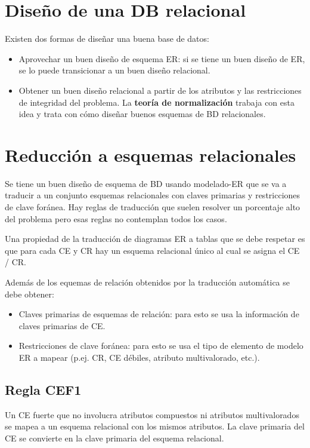 \documentclass[12pt,a4paper]{report}
\begin{document}
	\section{Diseño de una DB relacional}
		\par Existen dos formas de diseñar una buena base de datos:
		\begin{itemize}
			\item Aprovechar un buen diseño de esquema ER: si se tiene un buen diseño de ER, se lo puede transicionar a un buen diseño relacional. 
			\item Obtener un buen diseño relacional a partir de los atributos y las restricciones de integridad del problema. La \textbf{teoría de normalización} trabaja con esta idea y trata con cómo diseñar buenos esquemas de BD relacionales.
		\end{itemize}
	
	\section{Reducción a esquemas relacionales}
		\par Se tiene un buen diseño de esquema de BD usando modelado-ER que se va a 
traducir a un conjunto esquemas relacionales con claves primarias y restricciones de clave foránea. Hay reglas de traducción que suelen resolver un porcentaje alto del problema pero esas reglas no contemplan todos los casos.

		\par Una propiedad de la traducción de diagramas ER a tablas que se debe respetar es que para cada CE y CR hay un esquema relacional único al cual se asigna el CE / CR.
		
		\vspace{5mm}		
		\par Además de los equemas de relación obtenidos por la traducción automática se debe obtener:
		\begin{itemize}
			\item Claves primarias de esquemas de relación: para esto se usa la información de claves primarias de CE.
			\item Restricciones de clave foránea: para esto se usa el tipo de elemento de modelo ER a mapear (p.ej. CR, CE débiles, atributo multivalorado, etc.).
		\end{itemize}

		\subsection{Regla CEF1}
			\par Un CE fuerte que no involucra atributos compuestos ni atributos multivalorados se mapea a un esquema relacional con los mismos atributos. La clave primaria del CE se convierte en la clave primaria del esquema relacional.
\end{document}

